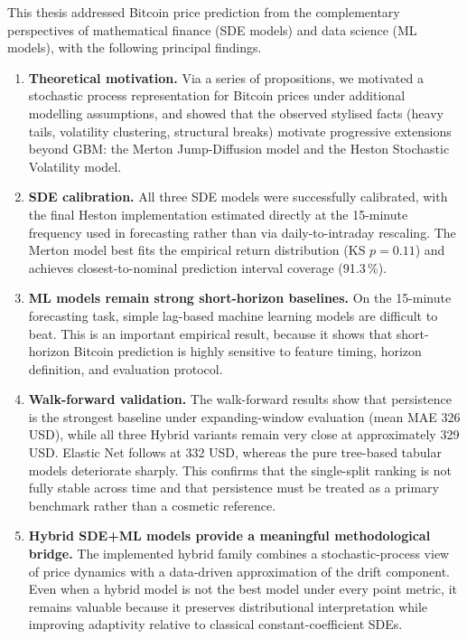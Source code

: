 \documentclass[12pt, a4paper, oneside]{report}
\theoremstyle{plain}
\theoremstyle{definition}
\theoremstyle{remark}
\begin{document}
This thesis addressed Bitcoin price prediction from the complementary
perspectives of mathematical finance (SDE models) and data science (ML
models), with the following principal findings.

\begin{enumerate}[leftmargin=1.25cm, label=\arabic*.]
  \item \textbf{Theoretical motivation.}  Via a series of propositions, we
    motivated a stochastic process representation for Bitcoin prices under
    additional modelling assumptions, and showed that the observed stylised
    facts (heavy tails, volatility clustering, structural breaks) motivate
    progressive extensions beyond GBM: the Merton Jump-Diffusion model and
    the Heston Stochastic Volatility model.

  \item \textbf{SDE calibration.}  All three SDE models were successfully
    calibrated, with the final Heston implementation estimated directly at the
    15-minute frequency used in forecasting rather than via daily-to-intraday
    rescaling.  The Merton model best fits the empirical
    return distribution (KS $p = 0.11$) and achieves closest-to-nominal
    prediction interval coverage (91.3\,\%).

  \item \textbf{ML models remain strong short-horizon baselines.}  On the
    15-minute forecasting task, simple lag-based machine learning models are
    difficult to beat.  This is an important empirical result, because it shows
    that short-horizon Bitcoin prediction is highly sensitive to feature timing,
    horizon definition, and evaluation protocol.

  \item \textbf{Walk-forward validation.}  The walk-forward results show that
    persistence is the strongest baseline under expanding-window evaluation
    (mean MAE 326 USD), while all three Hybrid variants remain very close at
    approximately 329 USD.  Elastic Net follows at 332 USD, whereas the pure
    tree-based tabular models deteriorate sharply.  This confirms that the
    single-split ranking is not fully stable across time and that persistence
    must be treated as a primary benchmark rather than a cosmetic reference.

  \item \textbf{Hybrid SDE+ML models provide a meaningful methodological
    bridge.}  The implemented hybrid family combines a stochastic-process view
    of price dynamics with a data-driven approximation of the drift component.
    Even when a hybrid model is not the best model under every point metric, it
    remains valuable because it preserves distributional interpretation while
    improving adaptivity relative to classical constant-coefficient SDEs.


\end{enumerate}
\end{document}
